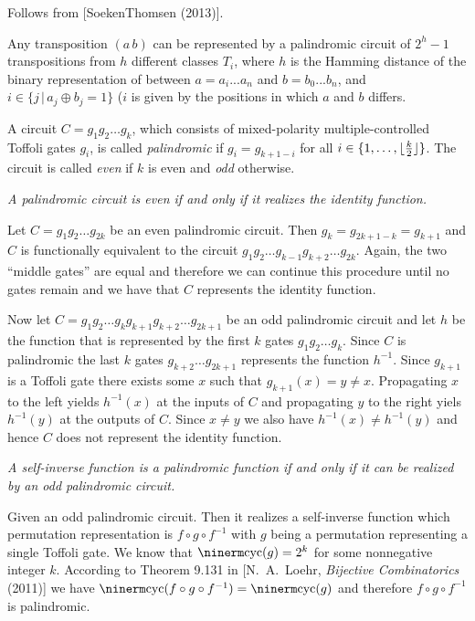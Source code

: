 \smallskip{} Follows from [SoekenThomsen (2013)]. \qquad\slug

Any transposition $(a\,b)$ can be represented by a palindromic circuit of $2^h-1$ transpositions from $h$ different classes $T_i$, where $h$ is the Hamming distance of the binary representation of between $a = a_i...a_n$ and $b = b_0...b_n$, and $i \in \{ j \,|\, a_j \oplus b_j = 1 \}$ ($i$ is given by the positions in which $a$ and $b$ differs.

\medskip {}\enspace A circuit
$C=g_1g_2\dots g_k$, which consists of mixed-polarity multiple-controlled
Toffoli gates $g_i$, is called {\it palindromic\/} if $ g_i = g_{k+1-i}$ for all
$i \in \{1,\dots,\lfloor{k\over 2}\rfloor\}$.  The circuit is called {\it
even\/} if $k$ is even and {\it odd\/} otherwise.

\smallskip {} \sl A palindromic circuit is even if and only
if it realizes the identity function. \rm

\smallskip{} Let $C=g_1g_2\dots g_{2k}$ be an even
palindromic circuit.  Then $g_{k}=g_{2k+1-k}=g_{k+1}$ and $C$ is functionally
equivalent to the circuit $g_1g_2\dots g_{k-1}g_{k+2} \dots g_{2k}$.  Again, the
two ``middle gates'' are equal and therefore we can continue this procedure
until no gates remain and we have that $C$ represents the identity function.

Now let $C=g_1g_2\dots g_kg_{k+1}g_{k+2}\dots g_{2k+1}$ be an odd palindromic
circuit and let $h$ be the function that is represented by the first $k$ gates
$g_1g_2\dots g_k$.  Since $C$ is palindromic the last $k$ gates $g_{k+2}\dots
g_{2k+1}$ represents the function $h^{-1}$.  Since $g_{k+1}$ is a Toffoli gate
there exists some $x$ such that $g_{k+1}(x)=y\neq x$.  Propagating $x$ to the
left yields $h^{-1}(x)$ at the inputs of $C$ and propagating $y$ to the right
yiels $h^{-1}(y)$ at the outputs of $C$.  Since $x\neq y$ we also have
$h^{-1}(x)\neq h^{-1}(y)$ and hence $C$ does not represent the identity
function.\qquad\slug

 \sl A self-inverse function is a palindromic function if
and only if it can be realized by an odd palindromic circuit. \rm

\smallskip{} Given an odd palindromic circuit.  Then it
realizes a self-inverse function which permutation representation is $f\circ
g\circ f^{-1}$ with $g$ being a permutation representing a single Toffoli
gate. We know that ${\rm cyc}(g)=2^k$ for some nonnegative integer $k$.
According to Theorem 9.131 in [N.\ A.\ Loehr, {\sl Bijective Combinatorics\/}
(2011)] we have ${\rm cyc}(f\circ g\circ f^{-1}) = {\rm cyc}(g)$ and therefore
$f\circ g\circ f^{-1}$ is palindromic.

